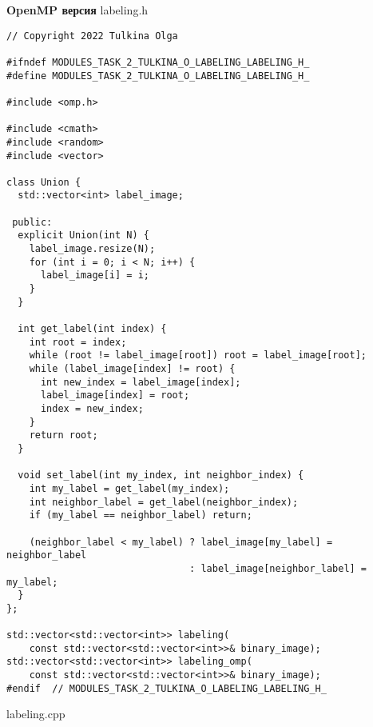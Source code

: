 \documentclass[12pt]{article}
\begin{document}
\textbf{OpenMP версия}
\newline
\newline labeling.h
\begin{lstlisting}
// Copyright 2022 Tulkina Olga

#ifndef MODULES_TASK_2_TULKINA_O_LABELING_LABELING_H_
#define MODULES_TASK_2_TULKINA_O_LABELING_LABELING_H_

#include <omp.h>

#include <cmath>
#include <random>
#include <vector>

class Union {
  std::vector<int> label_image;

 public:
  explicit Union(int N) {
    label_image.resize(N);
    for (int i = 0; i < N; i++) {
      label_image[i] = i;
    }
  }

  int get_label(int index) {
    int root = index;
    while (root != label_image[root]) root = label_image[root];
    while (label_image[index] != root) {
      int new_index = label_image[index];
      label_image[index] = root;
      index = new_index;
    }
    return root;
  }

  void set_label(int my_index, int neighbor_index) {
    int my_label = get_label(my_index);
    int neighbor_label = get_label(neighbor_index);
    if (my_label == neighbor_label) return;

    (neighbor_label < my_label) ? label_image[my_label] = neighbor_label
                                : label_image[neighbor_label] = my_label;
  }
};

std::vector<std::vector<int>> labeling(
    const std::vector<std::vector<int>>& binary_image);
std::vector<std::vector<int>> labeling_omp(
    const std::vector<std::vector<int>>& binary_image);
#endif  // MODULES_TASK_2_TULKINA_O_LABELING_LABELING_H_
\end{lstlisting}
labeling.cpp
\end{document}
